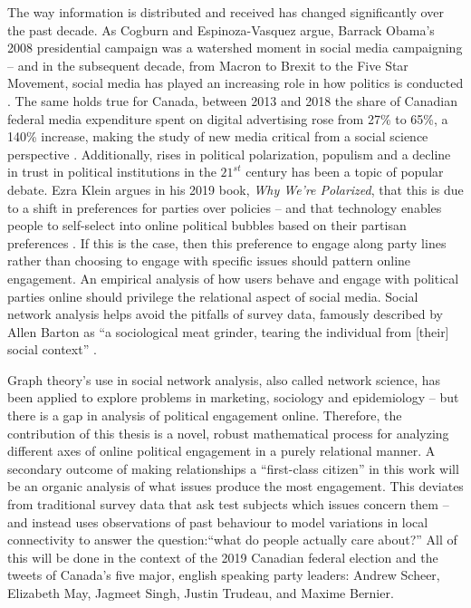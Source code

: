The way information is distributed and received has changed significantly over
the past decade. As Cogburn and Espinoza-Vasquez argue, Barrack Obama’s 2008
presidential campaign was a watershed moment in social media campaigning -- and
in the subsequent decade, from Macron to Brexit to the Five Star Movement,
social media has played an increasing role in how politics is conducted
\cite{cogburn2011networked}. The same holds true for Canada, between 2013 and
2018 the share of Canadian federal media expenditure spent on digital
advertising rose from 27\% to 65\%, a 140\% increase, making the study of new
media critical from a social science perspective
\cite{annualReportCanadaAdvertisingActivities_2018}. Additionally, rises in
political polarization, populism and a decline in trust in political
institutions in the $21^{st}$ century has been a topic of popular debate. Ezra
Klein argues in his 2019 book, \emph{Why We're Polarized}, that this is due to a
shift in preferences for parties over policies -- and that technology enables
people to self-select into online political bubbles based on their partisan
preferences \cite{levitsky2018democracies}. If this is the case, then this
preference to engage along party lines rather than choosing to engage with
specific issues should pattern online engagement. An empirical analysis of how
users behave and engage with political parties online should privilege the
relational aspect of social media. Social network analysis helps avoid the
pitfalls of survey data, famously described by Allen Barton as ``a sociological
meat grinder, tearing the individual from [their] social context''
\cite{freeman2004development}.

Graph theory’s use in social network analysis, also called network science, has
been applied to explore problems in marketing, sociology and epidemiology -- but
there is a gap in analysis of political engagement online. Therefore, the
contribution of this thesis is a novel, robust mathematical process for
analyzing different axes of online political engagement in a purely relational
manner. A secondary outcome of making relationships a “first-class citizen” in
this work will be an organic analysis of what issues produce the most
engagement. This deviates from traditional survey data that ask test subjects
which issues concern them -- and instead uses observations of past behaviour to
model variations in local connectivity to answer the question:“what do people
actually care about?” All of this will be done in the context of the 2019
Canadian federal election and the tweets of Canada's five major, english
speaking party leaders: Andrew Scheer, Elizabeth May, Jagmeet Singh, Justin
Trudeau, and Maxime Bernier. 

